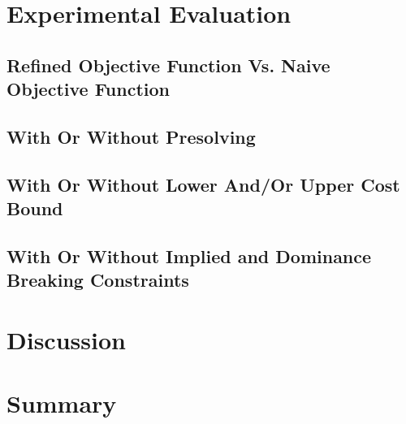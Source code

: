 
\section{Experimental Evaluation}
\subsection{Refined Objective Function Vs. Naive Objective Function}
\subsection{With Or Without Presolving}
\subsection{With Or Without Lower And/Or Upper Cost Bound}
\subsection{With Or Without Implied and Dominance Breaking Constraints}

\section{Discussion}


\section{Summary}

